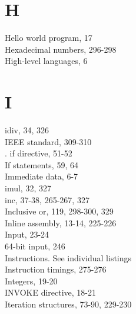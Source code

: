 \documentclass[10pt]{article}
\begin{document}
\section*{H}
Hello world program, 17\\
Hexadecimal numbers, 296-298\\
High-level languages, 6

\section*{I}
idiv, 34, 326\\
IEEE standard, 309-310\\
. if directive, 51-52\\
If statements, 59, 64\\
Immediate data, 6-7\\
imul, 32, 327\\
inc, 37-38, 265-267, 327\\
Inclusive or, 119, 298-300, 329\\
Inline assembly, 13-14, 225-226\\
Input, 23-24\\
64-bit input, 246\\
Instructions. See individual listings\\
Instruction timings, 275-276\\
Integers, 19-20\\
INVOKE directive, 18-21\\
Iteration structures, 73-90, 229-230
\end{document}
